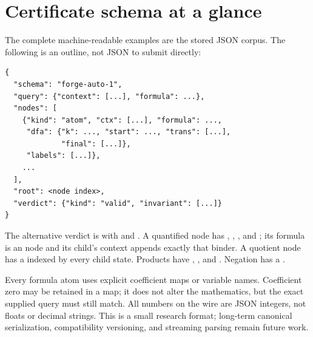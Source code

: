 \section{Certificate schema at a glance}
The complete machine-readable examples are the stored JSON corpus. The following is an outline, not JSON to submit directly:
\begin{lstlisting}
{
  "schema": "forge-auto-1",
  "query": {"context": [...], "formula": ...},
  "nodes": [
    {"kind": "atom", "ctx": [...], "formula": ...,
     "dfa": {"k": ..., "start": ..., "trans": [...],
             "final": [...]},
     "labels": [...]},
    ...
  ],
  "root": <node index>,
  "verdict": {"kind": "valid", "invariant": [...]}
}
\end{lstlisting}
The alternative verdict is  with  and . A quantified node has , , , and ; its formula is an  node and its child's context appends exactly that binder. A quotient node has a  indexed by every child state. Products have , , and . Negation has a .

Every formula atom uses explicit coefficient maps or variable names. Coefficient zero may be retained in a map; it does not alter the mathematics, but the exact supplied query must still match. All numbers on the wire are JSON integers, not floats or decimal strings. This is a small research format; long-term canonical serialization, compatibility versioning, and streaming parsing remain future work.

